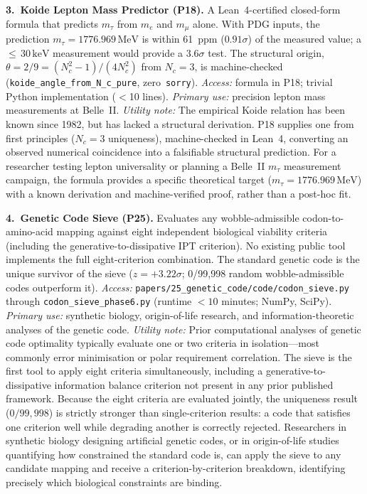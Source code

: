 \documentclass[11pt]{article}
\begin{document}
\medskip
\noindent\textbf{3.\ Koide Lepton Mass Predictor (P18).}
A Lean~4-certified closed-form formula that predicts $m_\tau$ from $m_e$ and
$m_\mu$ alone.  With PDG inputs, the prediction $m_\tau = 1776.969\,\mathrm{MeV}$
is within 61~ppm ($0.91\sigma$) of the measured value; a
${\leq}\,30\,\mathrm{keV}$ measurement would provide a $3.6\sigma$ test.  The structural origin,
$\theta = 2/9 = (N_c^2{-}1)/(4N_c^2)$ from $N_c=3$, is machine-checked
(\texttt{koide\_angle\_from\_N\_c\_pure}, zero~\texttt{sorry}).
\emph{Access:} formula in P18; trivial Python implementation ($<$10 lines).
\emph{Primary use:} precision lepton mass measurements at Belle~II.
\emph{Utility note:} The empirical Koide relation has been known since 1982, but
has lacked a structural derivation.
P18 supplies one from first principles ($N_c = 3$ uniqueness), machine-checked in
Lean~4, converting an observed numerical coincidence into a falsifiable structural
prediction.
For a researcher testing lepton universality or planning a Belle~II $m_\tau$
measurement campaign, the formula provides a specific theoretical target
($m_\tau = 1776.969\,\mathrm{MeV}$) with a known derivation and machine-verified proof,
rather than a post-hoc fit.

\medskip
\noindent\textbf{4.\ Genetic Code Sieve (P25).}
Evaluates any wobble-admissible codon-to-amino-acid mapping against eight
independent biological viability criteria (including the generative-to-dissipative
IPT criterion).  No existing public tool implements the full eight-criterion
combination.  The standard genetic code is the unique survivor of the sieve
($z = +3.22\sigma$; 0/99,998 random wobble-admissible codes outperform it).
\emph{Access:} \texttt{papers/25\_genetic\_code/code/codon\_sieve.py}
through \texttt{codon\_sieve\_phase6.py} (runtime $<10$ minutes; NumPy, SciPy).
\emph{Primary use:} synthetic biology, origin-of-life research, and
information-theoretic analyses of the genetic code.
\emph{Utility note:} Prior computational analyses of genetic code optimality
typically evaluate one or two criteria in isolation---most commonly error
minimisation or polar requirement correlation.
The sieve is the first tool to apply eight criteria simultaneously, including
a generative-to-dissipative information balance criterion not present in any
prior published framework.
Because the eight criteria are evaluated jointly, the uniqueness result ($0/99{,}998$)
is strictly stronger than single-criterion results: a code that satisfies one criterion
well while degrading another is correctly rejected.
Researchers in synthetic biology designing artificial genetic codes, or in
origin-of-life studies quantifying how constrained the standard code is,
can apply the sieve to any candidate mapping and receive a criterion-by-criterion
breakdown, identifying precisely which biological constraints are binding.
\end{document}
